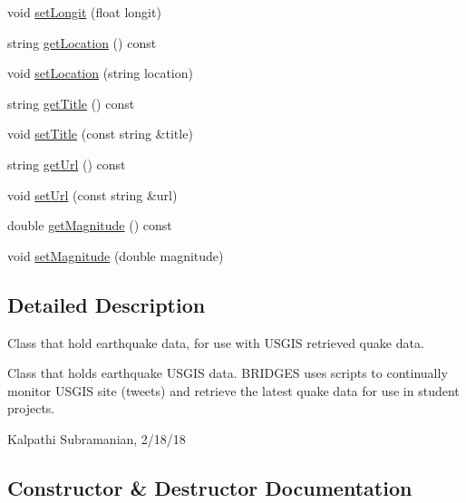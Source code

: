\begin{DoxyCompactItemize}
\item 
void \hyperlink{classbridges_1_1_earthquake_u_s_g_s_a745dc27f3c68a3ae996ceb7771d89ec5}{set\+Longit} (float longit)
\item 
string \hyperlink{classbridges_1_1_earthquake_u_s_g_s_a63bf958e1ac2b6b4797c1733b33c4463}{get\+Location} () const 
\item 
void \hyperlink{classbridges_1_1_earthquake_u_s_g_s_a5dc533759cc900440d70bdfc68f16599}{set\+Location} (string location)
\item 
string \hyperlink{classbridges_1_1_earthquake_u_s_g_s_ab0ecd24e7a2679919b53d3fa27d7429c}{get\+Title} () const 
\item 
void \hyperlink{classbridges_1_1_earthquake_u_s_g_s_a2de7081d9124c85971b189c08f980469}{set\+Title} (const string \&title)
\item 
string \hyperlink{classbridges_1_1_earthquake_u_s_g_s_a0a82972d7f72a10fd5899dcc26715a9d}{get\+Url} () const 
\item 
void \hyperlink{classbridges_1_1_earthquake_u_s_g_s_a4ee05f6d980ba3101f598c6cfd04fdf2}{set\+Url} (const string \&url)
\item 
double \hyperlink{classbridges_1_1_earthquake_u_s_g_s_a4e28322b7c9585c7bf56876c52693565}{get\+Magnitude} () const 
\item 
void \hyperlink{classbridges_1_1_earthquake_u_s_g_s_aae8be6112f5c27c168c452261d9b29a2}{set\+Magnitude} (double magnitude)
\end{DoxyCompactItemize}


\subsection{Detailed Description}
Class that hold earthquake data, for use with U\+S\+G\+I\+S retrieved quake data. 

Class that holds earthquake U\+S\+G\+I\+S data. B\+R\+I\+D\+G\+E\+S uses scripts to continually monitor U\+S\+G\+I\+S site (tweets) and retrieve the latest quake data for use in student projects.

Kalpathi Subramanian, 2/18/18 

\subsection{Constructor \& Destructor Documentation}
\hypertarget{classbridges_1_1_earthquake_u_s_g_s_a540ae74c248da179fbbd182b843a14e0}{}
